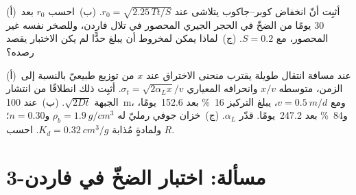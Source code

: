 \begin{exercise}[$\star\star\star$]\label{exo:b3:hydrogeology:11}
(أ)~أثبِت أنّ انخفاض كوبر--جاكوب يتلاشى عند $r_0 =
\sqrt{2.25\,Tt/S}$. (ب)~احسب $r_0$ بعد 30 يومًا من الضخّ في
الحجر الجيري المحصور في تلال فاردن، وللصخر نفسه غير المحصور، مع $S =
0.2$. (ج)~لماذا يمكن لمخروط  أن يبلغ حدًّا
لم يكن الاختبار يقصد رصده؟
\end{exercise}

\begin{exercise}[$\star\star\star$]\label{exo:b3:hydrogeology:12}
(أ)~عند مسافة انتقال طويلة يقترب منحنى الاختراق عند $x$ من توزيع
طبيعيّ بالنسبة إلى الزمن، متوسطه $x/v$ وانحرافه المعياري $\sigma_t
= \sqrt{2\alpha_Lx}/v$. أثبِت ذلك انطلاقًا من انتشار الجبهة $\sqrt{2Dt}$.
(ب)~عند \qty{100}{m}، ومع $v = \qty{0.5}{m/d}$، يبلغ التركيز
\qty{16}{\percent} بعد \num{152.6}~يومًا، و\qty{84}{\percent} بعد
\num{247.2}~يومًا. قدّر $\alpha_L$. (ج)~خزان جوفي رمليّ له $\rho_b =
\qty{1.9}{g/cm^3}$ و$n = 0.30$؛ ولمادةٍ مُذابة $K_d =
\qty{0.32}{cm^3/g}$. احسب $R$.
\end{exercise}

\section{مسألة: اختبار الضخّ في فاردن-3}

